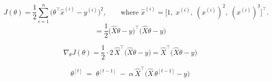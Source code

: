 \begin{answer}
$$
J(\theta)=\frac12\sum_{i=1}^{n}\bigl(\theta^{\top}\hat{x}^{(i)}-y^{(i)}\bigr)^2,
\qquad\text{where } \hat{x}^{(i)}=\bigl[1,\;x^{(i)},\;(x^{(i)})^2,\;(x^{(i)})^3\bigr]^{\!\top}.
$$
$$
=\frac12\bigl(\hat{X}\theta-y\bigr)^{\!\top}\bigl(\hat{X}\theta-y\bigr)
$$

$$
\nabla_{\theta}J(\theta)=\frac12\cdot2\,\hat{X}^{\top}\bigl(\hat{X}\theta-y\bigr)=\hat{X}^{\top}\bigl(\hat{X}\theta-y\bigr)
$$

$$
\boxed{\;
\theta^{[t]} \;=\; \theta^{[t-1]} \;-\;\alpha\,\hat{X}^{\top}\bigl(\hat{X}\,\theta^{[t-1]} - y\bigr)
\;}
$$

\end{answer}
